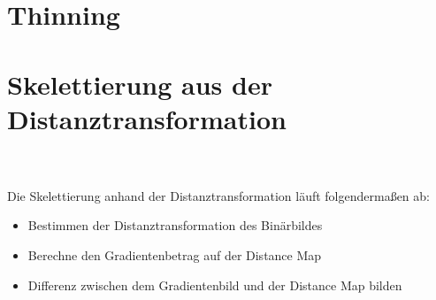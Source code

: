 \section{Thinning}  %
\section{Skelettierung aus der Distanztransformation}
\\\\
Die Skelettierung anhand der Distanztransformation läuft folgendermaßen ab:
\begin{itemize}
\item Bestimmen der Distanztransformation des Binärbildes
\item Berechne den Gradientenbetrag auf der Distance Map
\item Differenz zwischen dem Gradientenbild und der Distance Map bilden
\end{itemize}